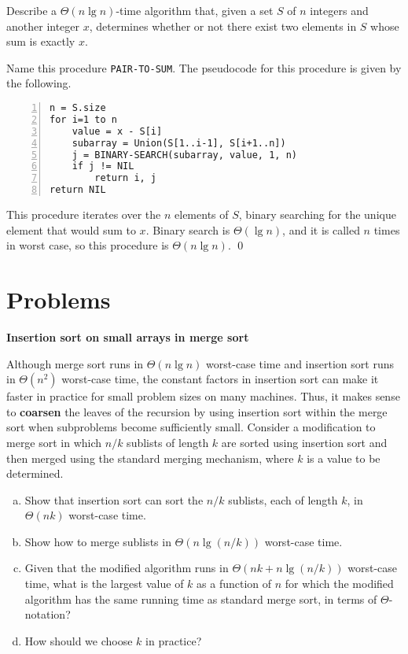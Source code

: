  Describe a $\Theta(n \lg n)$-time algorithm that, given a set $S$ of $n$ integers and another integer $x$, determines whether or not there exist two elements in $S$ whose sum is exactly $x$.

\sol Name this procedure \verb|PAIR-TO-SUM|. The pseudocode for this procedure is given by the following.
\begin{Verbatim}[frame=single,numbers=left,samepage=true,label={PAIR-TO-SUM(S, x)}]
n = S.size
for i=1 to n
    value = x - S[i]
    subarray = Union(S[1..i-1], S[i+1..n])
    j = BINARY-SEARCH(subarray, value, 1, n)
    if j != NIL
        return i, j
return NIL
\end{Verbatim}
This procedure iterates over the $n$ elements of $S$, binary searching for the unique element that would sum to $x$. Binary search is $\Theta(\lg n)$, and it is called $n$ times in worst case, so this procedure is $\Theta(n \lg n)$.
\qed

\section{Problems}

 \textbf{Insertion sort on small arrays in merge sort}

Although merge sort runs in $\Theta(n \lg n)$ worst-case time and insertion sort runs in $\Theta(n^2)$ worst-case time, the constant factors in insertion sort can make it faster in practice for small problem sizes on many machines. Thus, it makes sense to \textbf{coarsen} the leaves of the recursion by using insertion sort within the merge sort when subproblems become sufficiently small. Consider a modification to merge sort in which $n/k$ sublists of length $k$ are sorted using insertion sort and then merged using the standard merging mechanism, where $k$ is a value to be determined.

\begin{enumerate}[(a)]
    \item Show that insertion sort can sort the $n/k$ sublists, each of length $k$, in $\Theta(nk)$ worst-case time.
    \item Show how to merge sublists in $\Theta(n \lg(n/k))$ worst-case time.
    \item Given that the modified algorithm runs in $\Theta(nk + n\lg(n/k))$ worst-case time, what is the largest value of $k$ as a function of $n$ for which the modified algorithm has the same running time as standard merge sort, in terms of $\Theta$-notation?
    \item How should we choose $k$ in practice?
\end{enumerate}

